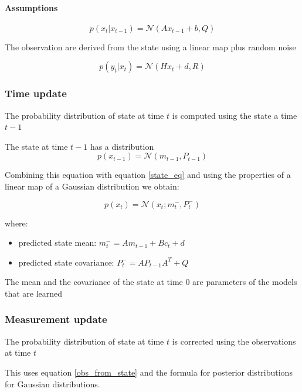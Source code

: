 \documentclass{article}
\let\Oldsubsubsection\subsubsection
\renewcommand{\subsubsection}{\FloatBarrier\Oldsubsubsection}
\begin{document}
\paragraph{Assumptions}

\begin{equation}\label{state_eq}
p(x_t | x_{t-1}) = \mathcal{N}(Ax_{t-1} + b, Q)
\end{equation}

The observation are derived from the state using a linear map plus random noise

\begin{equation}\label{obs_from_state}
    p(y_t | x_t) = \mathcal{N}(Hx_t + d, R)
\end{equation}


\subsubsection{Time update}

The probability distribution of state at time $t$ is computed using the state a time $t-1$

The state at time $t-1$ has a distribution $$ p(x_{t-1}) = \mathcal{N}(m_{t-1}, P_{t-1}) $$ 

Combining this equation with equation \ref{state_eq} and using the properties of a linear map of a Gaussian distribution we obtain:

\begin{equation}
    \label{filter_predict}p(x_t) = \mathcal{N}(x_t; m_t^-, P_t^-)
\end{equation} 

where:
\begin{itemize}
    \item predicted state mean: $m_t^- = Am_{t-1} + B c_t + d$   
    \item predicted state covariance: $P_t^- = AP_{t-1}A^T + Q$
\end{itemize}

The mean and the covariance of the state at time $0$ are parameters of the models that are learned

\subsubsection{Measurement update}

The probability distribution of state at time $t$ is corrected using the observations at time $t$

This uses equation \ref{obs_from_state} and the formula for posterior distributions for Gaussian distributions.
\end{document}
